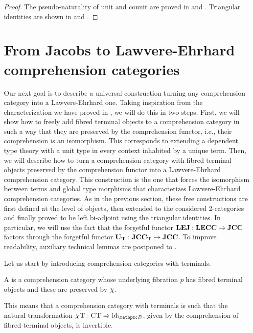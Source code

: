 \documentclass{lmcs} %
\theoremstyle{plain}\newtheorem{satz}[thm]{Satz} %
\begin{document}
			\begin{proof}
				The pseudo-naturality of unit and counit are proved in  and . Triangular identities are shown in  and .
			\end{proof}

\section{From Jacobs to Lawvere-Ehrhard comprehension categories}
\label{sect:JtoL} 

Our next goal is to describe a universal construction turning any comprehension category into a Lawvere-Ehrhard one. 
Taking inspiration from the characterization we have proved in , 
we will do this in two steps. 
% 
First, we will show how to freely add fibred terminal objects to a comprehension category in such a way that they are preserved by the comprehension functor, i.e., their comprehension is an isomorphism. 
This corresponds to extending a dependent type theory with a unit type in every context inhabited by a unique term. 
% 
Then, we will describe how to turn a comprehension category with fibred terminal objects preserved by the comprehension functor into a Lawvere-Ehrhard comprehension category. This construction is the one that forces the isomorphism between terms and global type morphisms that characterizes Lawvere-Ehrhard comprehension categories. 
% 
As in the previous section, these free constructions are first defined at the level of objects, then extended to the considered 2-categories and finally proved to be left bi-adjoint using the triangular identities. In particular, we will use the fact that the forgetful functor $\mathbf{LEJ}:\mathbf{LECC}\to\mathbf{JCC}$ factors through the forgetful functor $\mathbf{U_T}:\mathbf{JCC_T}\to\mathbf{JCC}$. To improve readability, auxiliary technical lemmas are postponed to . 

Let us start by introducing comprehension categories with terminals.

\begin{defi}
	A  is a comprehension category whose underlying fibration $p$ has fibred terminal objects and these are preserved by $\chi^{}$.
\end{defi}

This means that a comprehension category with terminals is such that the natural transformation $\jcomp{}\term{}:\comp{}\term{}\nt \id{\ct{B}}$, given by the comprehension of fibred terminal objects, is invertible.
\end{document}
